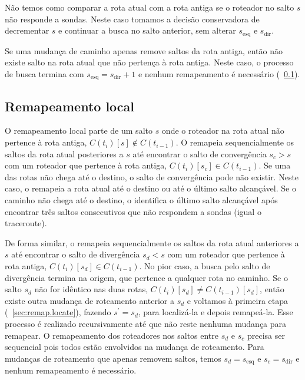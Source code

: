 Não temos como comparar a rota atual com a rota antiga se o roteador no
salto $s$ não responde a sondas.  Neste caso tomamos a decisão
conservadora de decrementar $s$ e continuar a busca no salto anterior,
sem alterar $s_\mathrm{esq}$ e $s_\mathrm{dir}$.  

Se uma mudança de caminho apenas remove saltos da rota antiga, então não
existe salto na rota atual que não pertença à rota antiga.  Neste caso,
o processo de busca termina com $s_\mathrm{esq} = s_\mathrm{dir} + 1$ e
nenhum remapeamento é necessário (\secstr~\ref{sec:remap.local}).

\subsection{Remapeamento local}
\label{sec:remap.local}

O remapeamento local parte de um salto $s$ onde o roteador na rota atual
não pertence à rota antiga, $C(t_i)[s] \notin C(t_{i-1})$.  O \rmprt{}
remapeia sequencialmente os saltos da rota atual posteriores a $s$ até
encontrar o salto de convergência $s_c > s$ com um roteador que pertence
à rota antiga, $C(t_i)[s_c] \in C(t_{i-1})$.  Se uma das rotas não chega
até o destino, o salto de convergência pode não existir.  Neste caso, o
\rmprt{} remapeia a rota atual até o destino ou até o último salto
alcançável.  Se o caminho não chega até o destino, o \rmprt{} identifica
o último salto alcançável após encontrar três saltos consecutivos que
não respondem a sondas (igual o traceroute).

De forma similar, o \rmprt{} remapeia sequencialmente os saltos da rota
atual anteriores a $s$ até encontrar o salto de divergência $s_d < s$
com um roteador que pertence à rota antiga, $C(t_i)[s_d] \in
C(t_{i-1})$.  No pior caso, a busca pelo salto de divergência termina na
origem, que pertence a qualquer rota no caminho.  Se o salto $s_d$ não
for idêntico nas duas rotas, $C(t_i)[s_d] \ne C(t_{i-1})[s_d]$, então
existe outra mudança de roteamento anterior a $s_d$ e voltamos à
primeira etapa (\secstr~\ref{sec:remap.locate}), fazendo $s^\prime =
s_d$, para localizá-la e depois remapeá-la.  Esse processo é realizado
recursivamente até que não reste nenhuma mudança para remapear.
%
O remapeamento dos roteadores nos saltos entre $s_d$ e $s_c$ precisa ser
sequencial pois todos estão envolvidos na mudança de roteamento.  Para
mudanças de roteamento que apenas removem saltos, temos $s_d =
s_\mathrm{esq}$ e $s_c = s_\mathrm{dir}$ e nenhum remapeamento é
necessário.

